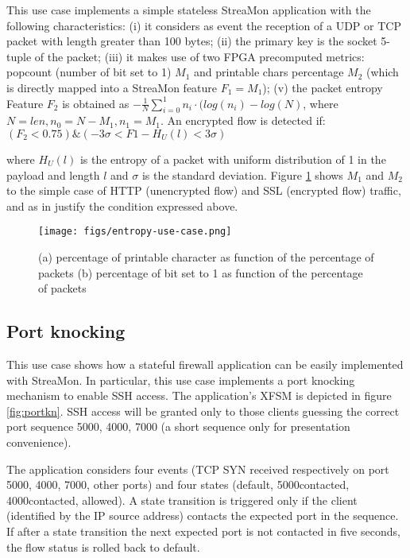 \documentclass[conference,letterpaper]{sig-alternate-10pt}
\begin{document}
This use case implements a simple stateless StreaMon application with the following characteristics: (i) it considers as event the reception of a UDP or TCP packet with length greater than 100 bytes; (ii) the primary key is the socket 5-tuple of the packet; (iii) it makes use of two FPGA precomputed  metrics: popcount (number of bit set to 1) $M_1$ and printable chars percentage $M_2$ (which is directly mapped into a StreaMon feature $F_1=M_1$); (v) the packet entropy Feature $F_2$ is obtained as $- \frac{1}{N} \sum_{i=0}^1 n_i \cdot (log(n_i)-log(N)$, where $N=len, n_0= N - M_1, n_1 = M_1$. An encrypted flow is detected if: $(F_2 < 0.75) \& (-3\sigma < F1- H_U(l)< 3\sigma)$

where $H_U(l)$ is the entropy of a packet with uniform distribution of 1 in the payload and length  $l$ and $\sigma$ is the standard deviation. Figure \ref{fig:entropy} shows $M_1$ and $M_2$ to the simple case of HTTP (unencrypted flow) and SSL (encrypted flow) traffic, and as in \cite{entropy} justify the condition expressed above. 

\begin{figure}[t]
	\centering
	\texttt{[image: figs/entropy-use-case.png]}
	\caption{(a) percentage of printable character as function of the percentage of packets (b) percentage of bit set to 1 as function of the percentage of packets}
	\vspace*{-.5cm}
	\label{fig:entropy}
\end{figure}

\subsection{Port knocking}
\label{s:pknock}
This use case shows how a stateful firewall application can be easily implemented with StreaMon. In particular, this use case implements a port knocking mechanism to enable SSH access. The application's XFSM is depicted in figure \ref{fig:portkn}. SSH access will be granted only to those clients guessing the correct port sequence 5000, 4000, 7000  (a short sequence only for presentation convenience).

The application considers four events (TCP SYN received respectively on port 5000, 4000, 7000, other ports) and four states (default, 5000contacted, 4000contacted, allowed). A state transition is triggered only if the client (identified by the IP source address) contacts the expected port in the sequence. If after a state transition the next expected port is not contacted in five seconds, the flow status is rolled back to default. 
\end{document}
